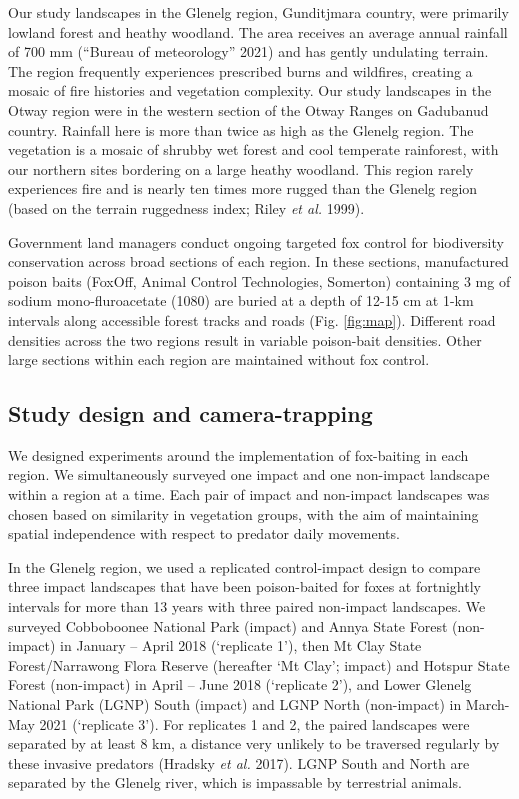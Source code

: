 \documentclass[]{elsarticle} %
\begin{document}
Our study landscapes in the Glenelg region, Gunditjmara country, were primarily lowland forest and heathy woodland. The area receives an average annual rainfall of 700 mm (``Bureau of meteorology'' 2021) and has gently undulating terrain. The region frequently experiences prescribed burns and wildfires, creating a mosaic of fire histories and vegetation complexity. Our study landscapes in the Otway region were in the western section of the Otway Ranges on Gadubanud country. Rainfall here is more than twice as high as the Glenelg region. The vegetation is a mosaic of shrubby wet forest and cool temperate rainforest, with our northern sites bordering on a large heathy woodland. This region rarely experiences fire and is nearly ten times more rugged than the Glenelg region (based on the terrain ruggedness index; Riley \emph{et al.} 1999).

Government land managers conduct ongoing targeted fox control for biodiversity conservation across broad sections of each region. In these sections, manufactured poison baits (FoxOff, Animal Control Technologies, Somerton) containing 3 mg of sodium mono-fluroacetate (1080) are buried at a depth of 12-15 cm at 1-km intervals along accessible forest tracks and roads (Fig. \ref{fig:map}). Different road densities across the two regions result in variable poison-bait densities. Other large sections within each region are maintained without fox control.

\hypertarget{study-design-and-camera-trapping}{%
\subsection{Study design and camera-trapping}\label{study-design-and-camera-trapping}}

We designed experiments around the implementation of fox-baiting in each region. We simultaneously surveyed one impact and one non-impact landscape within a region at a time. Each pair of impact and non-impact landscapes was chosen based on similarity in vegetation groups, with the aim of maintaining spatial independence with respect to predator daily movements.

In the Glenelg region, we used a replicated control-impact design to compare three impact landscapes that have been poison-baited for foxes at fortnightly intervals for more than 13 years with three paired non-impact landscapes. We surveyed Cobboboonee National Park (impact) and Annya State Forest (non-impact) in January -- April 2018 (`replicate 1'), then Mt Clay State Forest/Narrawong Flora Reserve (hereafter `Mt Clay'; impact) and Hotspur State Forest (non-impact) in April -- June 2018 (`replicate 2'), and Lower Glenelg National Park (LGNP) South (impact) and LGNP North (non-impact) in March-May 2021 (`replicate 3'). For replicates 1 and 2, the paired landscapes were separated by at least 8 km, a distance very unlikely to be traversed regularly by these invasive predators (Hradsky \emph{et al.} 2017). LGNP South and North are separated by the Glenelg river, which is impassable by terrestrial animals.
\end{document}
